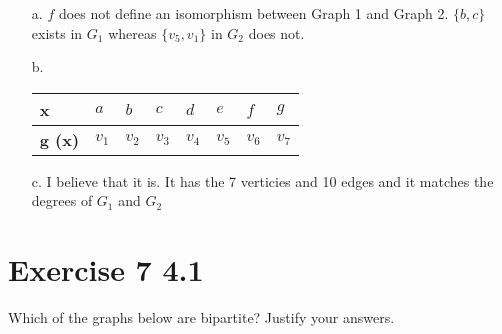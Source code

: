 \documentclass{article}
\begin{document}
\begin{enumerate}
    \item[a.] $f$ does not define an isomorphism between Graph 1 and Graph 2. $\{b, c\}$ exists in $G_1$ whereas $\{v_5, v_1\}$ in $G_2$ does not.
    \item[b.] 

    \begin{center}
        \begin{tabular}{llllllll}
        \textbf{x}&\(a\)&\(b\)&\(c\)&\(d\)&\(e\)&\(f\)&\(g\)\\
        \hline
        \textbf{g (x)}&\(v_1\)&\(v_2\)&\(v_3\)&\(v_4\)&\(v_5\)&\(v_6\)&\(v_7\)
        \end{tabular}
        \end{center}

    \item[c.] I believe that it is. It has the 7 verticies and 10 edges and it matches the degrees of $G_1$ and $G_2$
\end{enumerate}

\section*{Exercise 7 4.1}  

Which of the graphs below are bipartite? Justify your answers.%
\begin{center}
\end{center}
\end{document}
